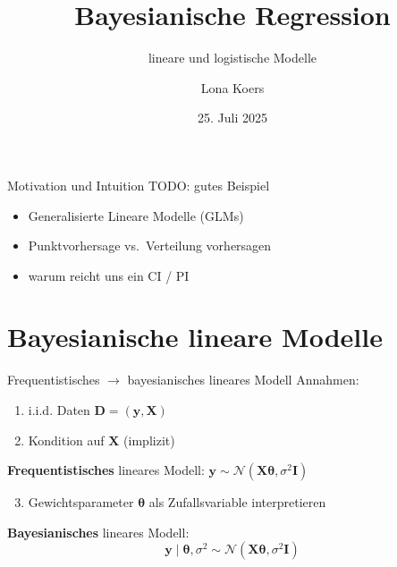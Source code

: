 \documentclass[
  ignorenonframetext,
  aspectratio=169,
]{beamer}
\title{Bayesianische Regression}
\subtitle{lineare und logistische Modelle}
\author{Lona Koers}
\date{25. Juli 2025}
\institute{LMU}
\providecommand{\tightlist}{%
  \setlength{\itemsep}{0pt}\setlength{\parskip}{0pt}}
\newcommand{\by}{\bm{y}}
\newcommand{\bD}{\bm{D}}
\newcommand{\bI}{\bm{I}}
\newcommand{\bX}{\bm{X}}
\newcommand{\Ncal}{\mathcal{N}}
\newcommand{\ssd}{\sigma^2}
\newcommand{\btheta}{\bm{\theta}}
\begin{document}
\frame{\titlepage}

\begin{frame}{Motivation und Intuition}
\protect{}\label{motivation-und-intuition}
TODO: gutes Beispiel

\begin{itemize}
\item
  Generalisierte Lineare Modelle (GLMs)
\item
  Punktvorhersage vs.~Verteilung vorhersagen
\item
  warum reicht uns ein CI / PI
\end{itemize}
\end{frame}

\section{\texorpdfstring{Bayesianische \textbf{lineare}
Modelle}{Bayesianische lineare Modelle}}\label{bayesianische-lineare-modelle}

\begin{frame}{Frequentistisches \(\to\) bayesianisches lineares Modell}
\protect{}\label{frequentistisches-to-bayesianisches-lineares-modell}
Annahmen:

\begin{enumerate}
\tightlist
\item
  i.i.d. Daten \(\bD = (\by, \bX)\)
\item
  Kondition auf \(\bX\) (implizit)
\end{enumerate}

\textbf{Frequentistisches} lineares Modell:
\(\by \sim \Ncal(\bX \btheta, \ssd \bI)\)

\begin{enumerate}
\setcounter{enumi}{2}
\tightlist
\item
  Gewichtsparameter \(\btheta\) als Zufallsvariable interpretieren
\end{enumerate}

\begin{block}{\textbf{Bayesianisches} lineares Modell:}
\protect{}\label{bayesianisches-lineares-modell}
\[\by \mid \btheta, \ssd \sim \Ncal(\bX \btheta, \ssd \bI)\]
\end{block}
\end{frame}
\end{document}
